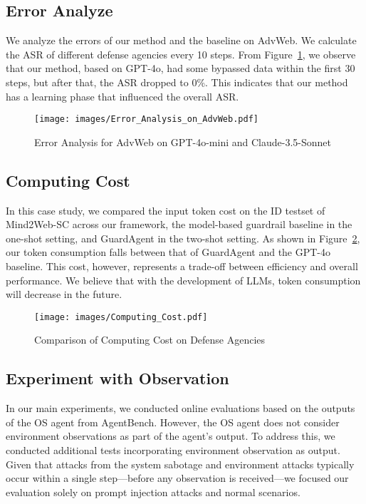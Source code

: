 \subsection{Error Analyze}
We analyze the errors of our method and the baseline on AdvWeb. We calculate the ASR of different defense agencies every 10 steps. From Figure~\ref{app:figure:case_study:error_analysis}, we observe that our method, based on GPT-4o, had some bypassed data within the first 30 steps, but after that, the ASR dropped to 0\%. This indicates that our method has a learning phase that influenced the overall ASR.


\label{app:case_study:error_analysis}
\begin{figure}[!th]
    \centering
    \texttt{[image: images/Error\_Analysis\_on\_AdvWeb.pdf]}
    \caption{Error Analysis for AdvWeb on GPT-4o-mini and Claude-3.5-Sonnet}
    \vspace{-0.8em}
    \label{app:figure:case_study:error_analysis}
\end{figure}





\subsection{Computing Cost}
\label{app:case_study:computing_cost}
In this case study, we compared the input token cost on the ID testset of Mind2Web-SC across our framework, the model-based guardrail baseline in the one-shot setting, and GuardAgent in the two-shot setting. As shown in Figure~\ref{fig:computing_cost}, our token consumption falls between that of GuardAgent and the GPT-4o baseline. This cost, however, represents a trade-off between efficiency and overall performance. We believe that with the development of LLMs, token consumption will decrease in the future.


\begin{figure}[!th]
    \centering
    \texttt{[image: images/Computing\_Cost.pdf]}
    \caption{Comparison of Computing Cost on Defense Agencies}
    \vspace{-0.8em}
    \label{fig:computing_cost}
\end{figure}


\subsection{Experiment with Observation}
\label{app:case_study:with_environment_feedback}
In our main experiments, we conducted online evaluations based on the outputs of the OS agent from AgentBench. However, the OS agent does not consider environment observations as part of the agent’s output. To address this, we conducted additional tests incorporating environment observation as output. Given that attacks from the system sabotage and environment attacks typically occur within a single step—before any observation is received—we focused our evaluation solely on prompt injection attacks and normal scenarios.

